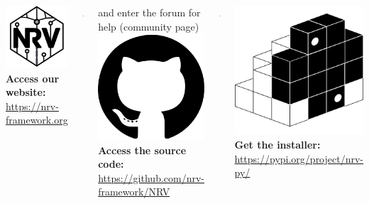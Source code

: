 \documentclass{NRVposter}
\begin{document}
\begin{columns}

 

{
    \includegraphics[width=0.015\columnwidth]{./images/NRV_bw.pdf}\textbf{Access our website:} \\ \url{https://nrv-framework.org}\\
            \begin{center}
                \includegraphics[width=0.08\columnwidth]{./images/qrcode_website.png}
            \end{center}
            and enter the forum for help (community page)\\
\includegraphics[width=0.015\columnwidth]{./images/github_logo.png} \textbf{Access the source code:} \\ \url{https://github.com/nrv-framework/NRV}\\
            \begin{center}
                \includegraphics[width=0.08\columnwidth]{./images/qrcode_github.png}
            \end{center}
\includegraphics[width=0.015\columnwidth]{./images/pypi_logo.png} \textbf{Get the installer:} \\ \url{https://pypi.org/project/nrv-py/}\\
}
\end{columns}
\end{document}
